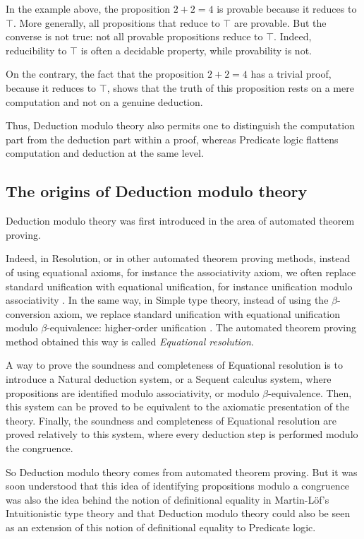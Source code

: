 \documentclass{llncs}
\begin{document}
In the example above, the proposition $2 + 2 = 4$ is provable because
it reduces to $\top$. More generally, all propositions that reduce to 
$\top$ are provable. But the converse is not true: not all provable 
propositions reduce to $\top$.  Indeed, reducibility to $\top$ is often a 
decidable property,
while provability is not.

On the contrary, the fact that the proposition $2 + 2 = 4$ has a
trivial proof, because it reduces to $\top$, 
shows that the truth of this proposition rests
on a mere computation and not on a genuine deduction. 

Thus, Deduction modulo theory also permits one to distinguish
the computation part from the deduction part
within a proof, whereas
Predicate logic
flattens computation and deduction at the same level.

\subsection{The origins of Deduction modulo theory}

Deduction modulo theory was first introduced in the area of 
automated theorem proving. 

Indeed, in Resolution, or in other automated theorem proving methods, 
instead of using equational
axioms, for instance the associativity axiom, we often replace standard
unification with equational unification, for instance unification
modulo associativity \cite{Plotkin}.  In the same
way, in Simple type theory, instead of using the $\beta$-conversion
axiom, we replace standard unification with equational
unification modulo $\beta$-equivalence:
higher-order unification \cite{Andrews71,Huet73,Huet75}. The 
automated theorem proving method obtained this way is called {\em Equational 
resolution}. 

A way to prove the soundness and completeness of Equational resolution
is to introduce a Natural deduction system, or a Sequent calculus
system, where propositions are identified modulo associativity, or
modulo $\beta$-equivalence. Then, this system can be proved to be
equivalent to the axiomatic presentation of the theory.  Finally, the
soundness and completeness of Equational resolution are proved
relatively to this system, where every deduction step is performed
modulo the congruence.

So Deduction modulo theory comes from automated theorem proving.  But
it was soon understood that this idea of identifying propositions
modulo a congruence was also the idea behind the notion of
definitional equality in Martin-L\"of's Intuitionistic type theory
\cite{MartinLof} and that Deduction modulo theory could also be seen
as an extension of this notion of definitional equality to Predicate
logic.
\end{document}
